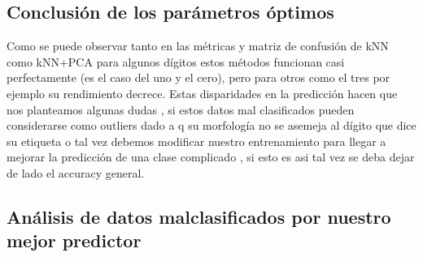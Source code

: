 \documentclass[a4paper,10pt]{article}
\begin{document}
\subsection{Conclusión de los parámetros óptimos}


Como se puede observar tanto en las métricas y matriz de confusión de kNN como kNN+PCA para algunos dígitos estos métodos funcionan casi perfectamente (es el caso del uno y el cero), pero para otros como el tres por ejemplo su rendimiento decrece. Estas disparidades en la predicción hacen que nos planteamos algunas dudas , si estos datos mal clasificados pueden considerarse como outliers dado a q su morfología no se asemeja al dígito que dice su etiqueta o tal vez debemos modificar nuestro entrenamiento para llegar a mejorar la predicción de una clase complicado , si esto es asi tal vez se deba dejar de lado el accuracy general.


\subsection{Análisis de datos malclasificados por nuestro mejor predictor}
\end{document}
